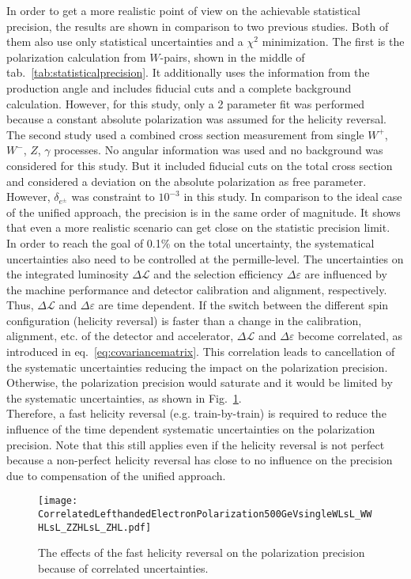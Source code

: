 \documentclass[a4paper]{article}
\begin{document}
In order to get a more realistic point of view on the achievable statistical precision, the results are shown in comparison to two previous studies. Both of them also use only statistical uncertainties and a $\chi^{2}$ minimization. The first is the polarization calculation from $W$-pairs, shown in the middle of tab.~\ref{tab:statisticalprecision}. It additionally uses the information from the production angle and includes fiducial cuts and a complete background calculation. However, for this study, only a 2 parameter fit was performed because a constant absolute polarization was assumed for the helicity reversal. The second study used a combined cross section measurement from single $W^{+}$, $W^{-}$, $Z$, $\gamma$ processes. No angular information was used and no background was considered for this study. But it included fiducial cuts on the total cross section and considered a deviation on the absolute polarization as free parameter. However, $\delta_{e^{\pm}}$ was constraint to $10^{-3}$ in this study. In comparison to the ideal case of the unified approach, the precision is in the same order of magnitude. It shows that even a more realistic scenario can get close on the statistic precision limit.\\
In order to reach the goal of 0.1\% on the total uncertainty, the systematical uncertainties also need to be controlled at the permille-level. The uncertainties on the integrated luminosity $\Delta\mathcal{L}$ and the selection efficiency $\Delta\varepsilon$ are influenced by the machine performance and detector calibration and alignment, respectively. Thus, $\Delta\mathcal{L}$ and $\Delta\varepsilon$ are time dependent. If the switch between the different spin configuration (helicity reversal) is faster than a change in the calibration, alignment, etc. of the detector and accelerator, $\Delta\mathcal{L}$ and $\Delta\varepsilon$ become correlated, as introduced in eq.~\ref{eq:covariancematrix}. This correlation leads to cancellation of the systematic uncertainties reducing the impact on the polarization precision. Otherwise, the polarization precision would saturate and it would be limited by the systematic uncertainties, as shown in Fig.~\ref{fig:correlateduncertainty}.\\
Therefore, a fast helicity reversal (e.g. train-by-train) is required to reduce the influence of the time dependent systematic uncertainties on the polarization precision. Note that this still applies even if the helicity reversal is not perfect because a non-perfect helicity reversal has close to no influence on the precision due to compensation of the unified approach.\\  
\begin{figure}[htbp]
\centering
\texttt{[image: CorrelatedLefthandedElectronPolarization500GeVsingleWLsL\_WWHLsL\_ZZHLsL\_ZHL.pdf]}
\caption{The effects of the fast helicity reversal on the polarization precision because of correlated uncertainties.}
\label{fig:correlateduncertainty}
\end{figure}
\end{document}
